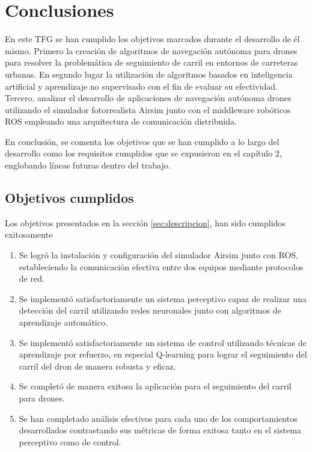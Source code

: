 \chapter{Conclusiones}
\label{cap:capitulo5}

En este TFG se han cumplido los objetivos marcados durante el desarrollo de él mismo. Primero la creación de algoritmos de
navegación autónoma para drones para resolver la problemática de seguimiento de carril en entornos de carreteras
urbanas. En segundo lugar la utilización de algoritmos basados en inteligencia artificial y aprendizaje no supervisado
con el fin de evaluar su efectividad. Tercero, analizar el desarrollo de aplicaciones de navegación autónoma drones
utilizando el simulador fotorrealista Airsim junto con el middleware robóticos ROS empleando una arquitectura de
comunicación distribuida. 

En conclusión, se comenta los objetivos que se han cumplido a lo largo del desarrollo como los requisitos cumplidos
que se expusieron en el capítulo 2, englobando líneas futuras dentro del trabajo. 

\section{Objetivos cumplidos}
\label{objetivos_cumplidos}

Los objetivos presentados en la sección \ref{sec:descripcion}, han sido cumplidos exitosamente 
\begin{enumerate}
    \item Se logró la instalación y configuración del simulador Airsim junto con ROS, estableciendo la comunicación efectiva
    entre dos equipos mediante protocolos de red. 
    \item Se implementó satisfactoriamente un sistema perceptivo capaz de realizar una detección del carril utilizando 
    redes neuronales junto con algoritmos de aprendizaje automático.
    \item Se implementó satisfactoriamente un sistema de control utilizando técnicas de aprendizaje por refuerzo, en especial Q-learning 
    para lograr el seguimiento del carril del dron de manera robusta y eficaz.
    \item Se completó de manera exitosa la aplicación para el seguimiento del carril para drones.
    \item Se han completado análisis efectivos para cada uno de los comportamientos desarrollados contrastando sus métricas
    de forma exitosa tanto en el sistema perceptivo como de control. 
\end{enumerate}

